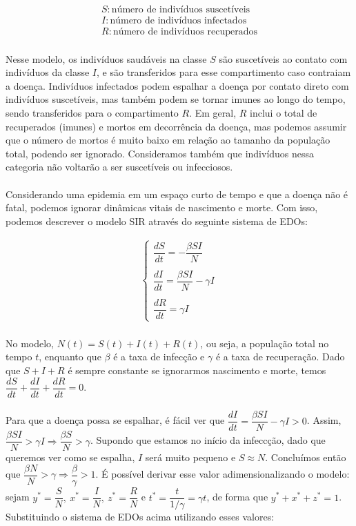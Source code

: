 \documentclass[12pt]{article}
\begin{document}
\begin{gather*}
    S: \text{número de indivíduos suscetíveis} \\
    I: \text{número de indivíduos infectados} \\
    R: \text{número de indivíduos recuperados}
\end{gather*}
\\
Nesse modelo, os indivíduos saudáveis na classe $S$ são suscetíveis ao contato com indivíduos da classe $I$, e são transferidos para esse compartimento caso contraiam a doença. Indivíduos infectados podem espalhar a doença por contato direto com indivíduos suscetíveis, mas também podem se tornar imunes ao longo do tempo, sendo transferidos para o compartimento $R$. Em geral, $R$ inclui o total de recuperados (imunes) e mortos em decorrência da doença, mas podemos assumir que o número de mortos é muito baixo em relação ao tamanho da população total, podendo ser ignorado. Consideramos também que indivíduos nessa categoria não voltarão a ser suscetíveis ou infecciosos.   
\\\\
Considerando uma epidemia em um espaço curto de tempo e que a doença não é fatal, podemos ignorar dinâmicas vitais de nascimento e morte. Com isso, podemos descrever o modelo SIR através do seguinte sistema de EDOs:

\begin{gather*}
\begin{cases}
\dfrac{dS}{dt} = -\dfrac{\beta SI}{N} \\
\\
\dfrac{dI}{dt} = \dfrac{\beta SI}{N} - \gamma I \\
\\
\dfrac{dR}{dt} = \gamma I
\end{cases}
\end{gather*}
\\
No modelo, $N(t) = S(t)+I(t)+R(t)$, ou seja, a população total no tempo $t$, enquanto que $\beta$ é a taxa de infecção e $\gamma$ é a taxa de recuperação. Dado que $S+I+R$ é sempre constante se ignorarmos nascimento e morte, temos $\dfrac{dS}{dt}+\dfrac{dI}{dt}+\dfrac{dR}{dt} = 0$. 
\\\\
Para que a doença possa se espalhar, é fácil ver que $\dfrac{dI}{dt} = \dfrac{\beta SI}{N} - \gamma I > 0$. Assim, $\dfrac{\beta SI}{N} > \gamma I \Rightarrow \dfrac{\beta S}{N} > \gamma$. Supondo que estamos no início da infeccção, dado que queremos ver como se espalha, $I$ será muito pequeno e $S \approx N$. Concluímos então que $\dfrac{\beta N}{N} > \gamma \Rightarrow \dfrac{\beta}{\gamma} > 1$. É possível derivar esse valor adimensionalizando o modelo: sejam $y^* = \dfrac{S}{N}, \ x^* = \dfrac{I}{N}, \ z^* = \dfrac{R}{N}$ e $t^*=\dfrac{t}{1/\gamma} = \gamma t$, de forma que $y^*+x^*+z^*=1$. Substituindo o sistema de EDOs acima utilizando esses valores:
\end{document}
